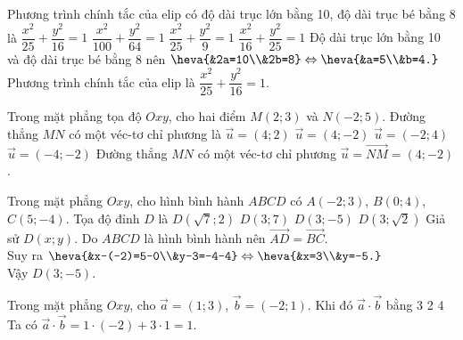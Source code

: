 \begin{ex}%
Phương trình chính tắc của elip có độ dài trục lớn bằng 10, độ dài trục bé bằng 8 là
\choice
{\True $\dfrac{x^2}{25}+\dfrac{y^2}{16}=1$}
{$\dfrac{x^2}{100}+\dfrac{y^2}{64}=1$}
{$\dfrac{x^2}{25}+\dfrac{y^2}{9}=1$}
{$\dfrac{x^2}{16}+\dfrac{y^2}{25}=1$}
\loigiai
{Độ dài trục lớn bằng 10 và độ dài trục bé bằng 8 nên $\heva{&2a=10\\&2b=8}\Leftrightarrow\heva{&a=5\\&b=4.}$\\
Phương trình chính tắc của elip là $\dfrac{x^2}{25}+\dfrac{y^2}{16}=1$.
}
\end{ex}

\begin{ex}%
Trong mặt phẳng tọa độ $Oxy$, cho hai điểm $M(2;3)$ và $N(-2;5)$. Đường thẳng $MN$ có một véc-tơ chỉ phương là
\choice
{$\overrightarrow{u}=(4;2)$}
{\True $\overrightarrow{u}=(4;-2)$}
{$\overrightarrow{u}=(-2;4)$}
{$\overrightarrow{u}=(-4;-2)$}
\loigiai
{Đường thẳng $MN$ có một véc-tơ chỉ phương $\overrightarrow{u}=\overrightarrow{NM}=(4;-2)$.
}
\end{ex}

\begin{ex}%
Trong mặt phẳng $Oxy$, cho hình bình hành $ABCD$ có $A(-2;3)$, $B(0;4)$, $C(5;-4)$. Tọa độ đỉnh $D$ là
\choice
{$D(\sqrt{7};2)$}
{$D(3;7)$}
{\True $D(3;-5)$}
{$D(3;\sqrt{2})$}
\loigiai
{Giả sử $D(x;y)$. Do $ABCD$ là hình bình hành nên $\overrightarrow{AD}=\overrightarrow{BC}$.\\
Suy ra $\heva{&x-(-2)=5-0\\&y-3=-4-4}\Leftrightarrow\heva{&x=3\\&y=-5.}$\\
Vậy $D(3;-5)$.
}
\end{ex}

\begin{ex}%
Trong mặt phẳng $Oxy$, cho $\overrightarrow{a}=(1;3)$, $\overrightarrow{b}=(-2;1)$. Khi đó $\overrightarrow{a}\cdot\overrightarrow{b}$ bằng
\choice
{3}
{2}
{4}
{}
\loigiai
{Ta có $\overrightarrow{a}\cdot\overrightarrow{b}=1\cdot(-2)+3\cdot1=1$.
}
\end{ex}


